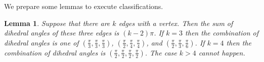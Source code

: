 \documentclass[suppldata, dvipdfmx]{interact}
\theoremstyle{plain}%
\newtheorem{theorem}{Theorem}[section]
\newtheorem{lemma}[theorem]{Lemma}
\theoremstyle{definition}
\theoremstyle{remark}
\theoremstyle{problemstyle}
\begin{document}





We prepare some lemmas to execute classifications.

\begin{lemma}\label{lemma:sum}
Suppose that there are $k$ edges with a vertex. Then the sum of
 dihedral angles of these three edges is $(k-2)\pi$.  If $k=3$ then the combination of dihedral angles is 
one of $\left( \frac{\pi}{3}, \frac{\pi}{3}, \frac{\pi}{3}\right)$, $\left( \frac{\pi}{2}, \frac{\pi}{4}, \frac{\pi}{4}\right)$, and $\left( \frac{\pi}{2}, \frac{\pi}{3}, \frac{\pi}{6}\right)$.
If $k=4$ then the combination of dihedral angles is 
$\left( \frac{\pi}{2}, \frac{\pi}{2}, \frac{\pi}{2}, \frac{\pi}{2}\right)$. The case $k>4$ cannot happen.
\end{lemma}
\end{document}
